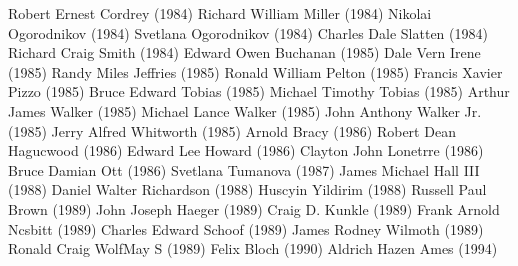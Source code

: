 \documentclass[12pt]{article}
\begin{document}
\begin{multicols}{2}
Robert Ernest Cordrey (1984)\newline
Richard William Miller (1984)\newline
Nikolai Ogorodnikov (1984)\newline
Svetlana Ogorodnikov (1984)\newline
Charles Dale Slatten (1984)\newline
Richard Craig Smith (1984)\newline
Edward Owen Buchanan (1985)\newline
Dale Vern Irene (1985)\newline
Randy Miles Jeffries (1985)\newline
Ronald William Pelton (1985)\newline
Francis Xavier Pizzo (1985)\newline
Bruce Edward Tobias (1985)\newline
Michael Timothy Tobias (1985)\newline
Arthur James Walker (1985)\newline
Michael Lance Walker (1985)\newline
John Anthony Walker Jr. (1985)\newline
Jerry Alfred Whitworth (1985)\newline
Arnold Bracy (1986)\newline
Robert Dean Hagucwood (1986)\newline
Edward Lee Howard (1986)\newline
Clayton John Lonetrre (1986)\newline
Bruce Damian Ott (1986)\newline
Svetlana Tumanova (1987)\newline
James Michael Hall III (1988)\newline
Daniel Walter Richardson (1988)\newline
Huscyin Yildirim (1988)\newline
Russell Paul Brown (1989)\newline
John Joseph Haeger (1989)\newline
Craig D. Kunkle (1989)\newline
Frank Arnold Ncsbitt (1989)\newline
Charles Edward Schoof (1989)\newline
James Rodney Wilmoth (1989)\newline
Ronald Craig WolfMay S (1989)\newline
Felix Bloch (1990)\newline
Aldrich Hazen Ames (1994)\newline

\end{multicols}
\end{document}
